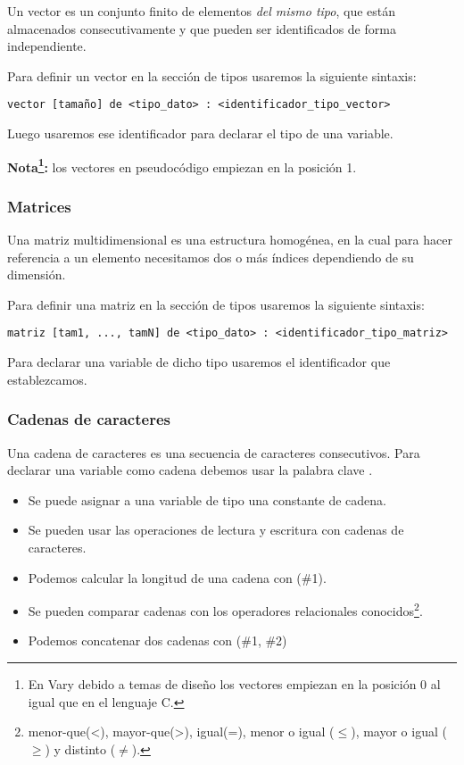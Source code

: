 \documentclass{article}
\begin{document}
Un vector es un conjunto finito de elementos \textit{del mismo tipo}, que están almacenados consecutivamente y que pueden ser identificados de forma independiente.

Para definir un vector en la sección de tipos usaremos la siguiente sintaxis:

\begin{lstlisting}[language = pseudocodigoesp]
vector [tamaño] de <tipo_dato> : <identificador_tipo_vector>  
\end{lstlisting}

Luego usaremos ese identificador para declarar el tipo de una variable.

\textbf{Nota\footnote{En Vary debido a temas de diseño los vectores empiezan en la posición 0 al igual que en el lenguaje C.}:} los vectores en pseudocódigo empiezan en la posición 1.

\subsubsection{Matrices}

Una matriz multidimensional es una estructura homogénea, en la cual para hacer referencia a un elemento necesitamos dos o más índices dependiendo de su dimensión.

Para definir una matriz en la sección de tipos usaremos la siguiente sintaxis:

\begin{lstlisting}[language = pseudocodigoesp]
matriz [tam1, ..., tamN] de <tipo_dato> : <identificador_tipo_matriz>
\end{lstlisting}

Para declarar una variable de dicho tipo usaremos el identificador que establezcamos.

\subsubsection{Cadenas de caracteres}

Una cadena de caracteres es una secuencia de caracteres consecutivos. Para declarar una variable como cadena debemos usar la palabra clave .

\begin{itemize}
\item Se puede asignar a una variable de tipo  una constante de cadena.
\item Se pueden usar las operaciones de lectura y escritura con cadenas de caracteres.
\item Podemos calcular la longitud de una cadena con (\#1).
\item Se pueden comparar cadenas con los operadores relacionales conocidos\footnote{menor-que(<), mayor-que(>), igual(=), menor o igual ($\leq$), mayor o igual ($\geq$) y distinto ($\neq$).}.
\item Podemos concatenar dos cadenas con (\#1, \#2)
\end{itemize}
\end{document}
